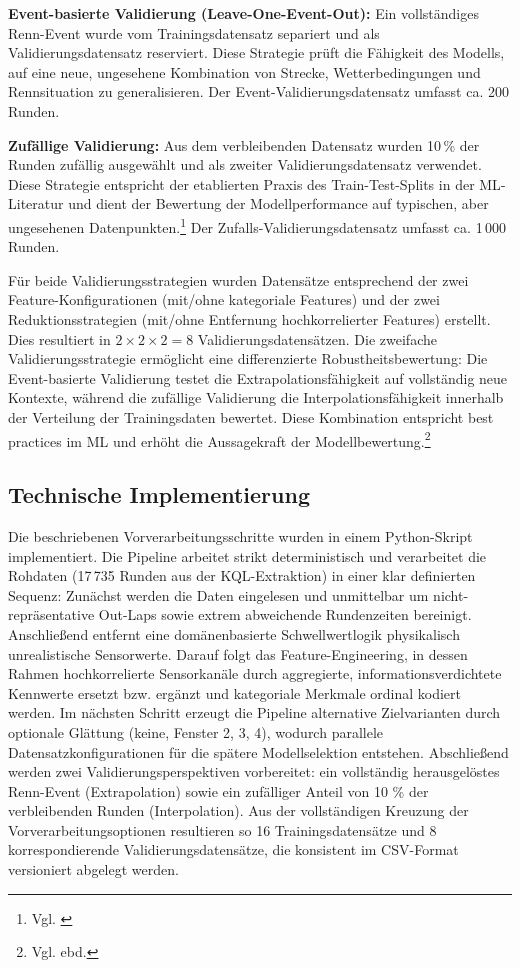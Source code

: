\textbf{Event-basierte Validierung (Leave-One-Event-Out):}
Ein vollständiges Renn-Event wurde vom Trainingsdatensatz separiert und als Validierungsdatensatz reserviert. Diese Strategie prüft die Fähigkeit des Modells, auf eine neue, ungesehene Kombination von Strecke, Wetterbedingungen und Rennsituation zu generalisieren. Der Event-Validierungsdatensatz umfasst ca. 200 Runden.

\textbf{Zufällige Validierung:}
Aus dem verbleibenden Datensatz wurden 10\,\% der Runden zufällig ausgewählt und als zweiter Validierungsdatensatz verwendet. Diese Strategie entspricht der etablierten Praxis des Train-Test-Splits in der \ac{ML}-Literatur und dient der Bewertung der Modellperformance auf typischen, aber ungesehenen Datenpunkten.\footnote{Vgl. \cite{Baheti2021}} Der Zufalls-Validierungsdatensatz umfasst ca. 1\,000 Runden.

Für beide Validierungsstrategien wurden Datensätze entsprechend der zwei Feature-Konfigurationen (mit/ohne kategoriale Features) und der zwei Reduktionsstrategien (mit/ohne Entfernung hochkorrelierter Features) erstellt. Dies resultiert in $2 \times 2 \times 2 = 8$ Validierungsdatensätzen.
Die zweifache Validierungsstrategie ermöglicht eine differenzierte Robustheitsbewertung: Die Event-basierte Validierung testet die Extrapolationsfähigkeit auf vollständig neue Kontexte, während die zufällige Validierung die Interpolationsfähigkeit innerhalb der Verteilung der Trainingsdaten bewertet. Diese Kombination entspricht best practices im \ac{ML} und erhöht die Aussagekraft der Modellbewertung.\footnote{Vgl. ebd.}


\subsection{Technische Implementierung}

Die beschriebenen Vorverarbeitungsschritte wurden in einem Python-Skript implementiert. Die Pipeline arbeitet strikt deterministisch und verarbeitet die Rohdaten (17\,735 Runden aus der KQL-Extraktion) in einer klar definierten Sequenz: Zunächst werden die Daten eingelesen und unmittelbar um nicht-repräsentative Out-Laps sowie extrem abweichende Rundenzeiten bereinigt. Anschließend entfernt eine domänenbasierte Schwellwertlogik physikalisch unrealistische Sensorwerte. Darauf folgt das Feature-Engineering, in dessen Rahmen hochkorrelierte Sensorkanäle durch aggregierte, informationsverdichtete Kennwerte ersetzt bzw. ergänzt und kategoriale Merkmale ordinal kodiert werden. Im nächsten Schritt erzeugt die Pipeline alternative Zielvarianten durch optionale Glättung (keine, Fenster 2, 3, 4), wodurch parallele Datensatzkonfigurationen für die spätere Modellselektion entstehen. Abschließend werden zwei Validierungsperspektiven vorbereitet: ein vollständig herausgelöstes Renn-Event (Extrapolation) sowie ein zufälliger Anteil von 10 \% der verbleibenden Runden (Interpolation). Aus der vollständigen Kreuzung der Vorverarbeitungsoptionen resultieren so 16 Trainingsdatensätze und 8 korrespondierende Validierungsdatensätze, die konsistent im CSV-Format versioniert abgelegt werden.

